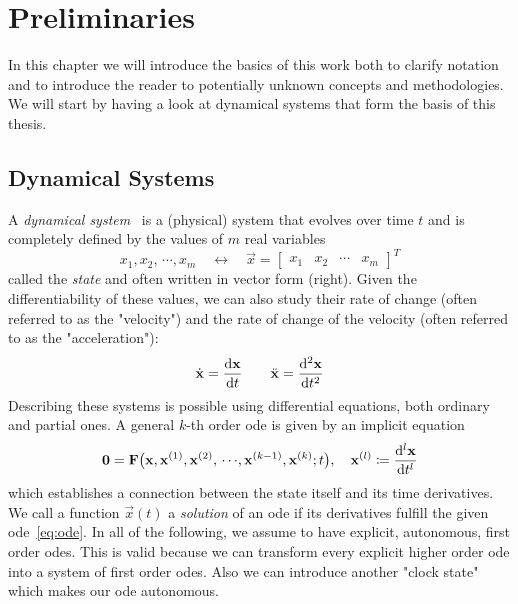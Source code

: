 \chapter{Preliminaries}
\label{c:preliminaries}



In this chapter we will introduce the basics of this work both to clarify notation and to introduce the reader to potentially unknown concepts and methodologies. We will start by having a look at dynamical systems that form the basis of this thesis.

\section{Dynamical Systems}  %
	A \emph{dynamical system}~\cite{birkhoffDynamicalSystems1927} is a (physical) system that evolves over time \(t\) and is completely defined by the values of \(m\) real variables
	\begin{equation*}
		x_1, x_2, \,\cdots\!, x_m \quad\longleftrightarrow\quad \vec{x} = \begin{bmatrix} x_1 & x_2 & \cdots & x_m \end{bmatrix}^T
	\end{equation*}
	called the \emph{state} and often written in vector form (right). Given the differentiability of these values, we can also study their rate of change (often referred to as the "velocity") and the rate of change of the velocity (often referred to as the "acceleration"):
	\begin{equation*}
		\dot{\boldsymbol{\mathrm{x}}} = \dv{\boldsymbol{\mathrm{x}}}{t} \qquad \ddot{\boldsymbol{\mathrm{x}}} = \dv[2]{\boldsymbol{\mathrm{x}}}{t}
	\end{equation*}
	Describing these systems is possible using differential equations, both ordinary and partial ones. A general \(k\)-th order \ac{ode} is given by an implicit equation
	\begin{equation}
		\boldsymbol{\mathrm{0}} = \boldsymbol{\mathrm{F}}\big( \boldsymbol{\mathrm{x}}, \boldsymbol{\mathrm{x}}^{(1)}, \boldsymbol{\mathrm{x}}^{(2)}, \,\cdots\!, \boldsymbol{\mathrm{x}}^{(k - 1)}, \boldsymbol{\mathrm{x}}^{(k)}; t \big),\quad \boldsymbol{\mathrm{x}}^{(l)} \coloneqq \dv[l]{\boldsymbol{\mathrm{x}}}{t}  \label{eq:ode}
	\end{equation}
	which establishes a connection between the state itself and its time derivatives. We call a function \( \vec{x}(t) \) a \emph{solution} of an \ac{ode} if its derivatives fulfill the given \ac{ode}~\eqref{eq:ode}. In all of the following, we assume to have explicit, autonomous, first order \acp{ode}. This is valid because we can transform every explicit higher order \ac{ode} into a system of first order \acp{ode}. Also we can introduce another "clock state" which makes our \ac{ode} autonomous.

